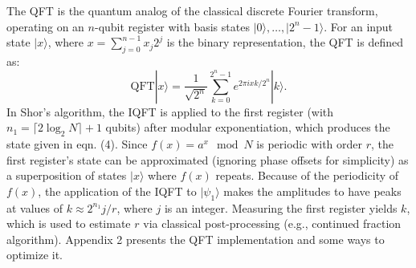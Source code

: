 \documentclass[conference,twoside]{IEEEtran}
\begin{document}
The QFT is the quantum analog of the classical discrete Fourier transform, operating on an \( n \)-qubit register with basis states \( |0\rangle, \ldots, |2^n-1\rangle \). For an input state \( |x\rangle \), where \( x = \sum_{j=0}^{n-1} x_j 2^j \) is the binary representation, the QFT is defined as:
\begin{equation}
\text{QFT} |x\rangle = \frac{1}{\sqrt{2^n}} \sum_{k=0}^{2^n-1} e^{2\pi i x k / 2^n} |k\rangle.
\end{equation}
In Shor's algorithm, the IQFT is applied to the first register (with \( n_1 =  \lceil 2 \log_2 N \rceil +1 \) qubits) after modular exponentiation, which produces the state given in eqn. (4).
Since \( f(x) = a^x \mod N \) is periodic with order \( r \), the first register’s state can be approximated (ignoring phase offsets for simplicity) as a superposition of states \( |x\rangle \) where \( f(x) \) repeats. Because of the periodicity of \( f(x) \), the application of the IQFT to \(|\psi_1\rangle \) makes the amplitudes to have peaks at values of \( k \approx 2^{n_1} j / r \), where \( j \) is an integer. Measuring the first register yields \( k \), which is used to estimate \( r \) via classical post-processing (e.g., continued fraction algorithm). Appendix 2 presents the QFT implementation and some ways to optimize it.
\\
\end{document}
